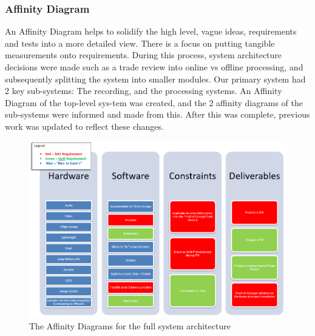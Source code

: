\documentclass{UoNMCHA}
\numberwithin{equation}{section}
\begin{document}
\subsubsection{Affinity Diagram}
An Affinity Diagram helps to solidify the high level, vague ideas, requirements and tests into a more detailed view. There is a focus on putting tangible measurements onto requirements. During this process, system architecture decisions were made such as a trade review into online vs offline processing, and subsequently splitting the system into smaller modules. Our primary system had 2 key sub-systems: The recording, and the processing systems. An Affinity Diagram of the top-level sys-tem was created, and the 2 affinity diagrams of the sub-systems were informed and made from this. After this was complete, previous work was updated to reflect these changes.
\begin{figure}[ht]
    \begin{center}
        \includegraphics[width=0.8\linewidth]{Figures/AffinityDiagram.png}
        \caption{The Affinity Diagrams for the full system architecture}
        \label{fig:AndroidDataExample}
    \end{center}
 \end{figure}
\end{document}
